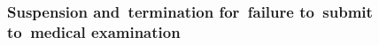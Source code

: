 \documentclass[12pt,a4paper]{article}
\begin{document}
%
%
%
%

\subsubsection[19. Suspension and~termination for~failure to~submit to~medical examination]{Suspension and~termination for~failure to~submit to~medical examination}
\end{document}
